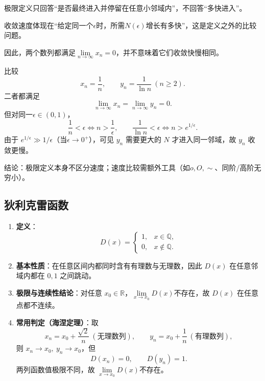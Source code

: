 \documentclass[../book.tex]{subfiles}
\begin{document}
\begin{enumerate}
\begin{itemize}
            \begin{circlenum}
                \item 极限定义只回答“是否最终进入并停留在任意小邻域内”，不回答“多快进入”。
                \item 收敛速度体现在“给定同一个$\epsilon$时，所需$N(\epsilon)$增长有多快”，这是定义之外的比较问题。
                \item 因此，两个数列都满足$\lim\limits_{n\to\infty}x_n=0$，并不意味着它们收敛快慢相同。
            \end{circlenum}
            \begin{analysisbox}[示例]
                比较
                \[
                    x_n=\frac1n,\qquad y_n=\frac1{\ln n}\ (n\ge2).
                \]
                二者都满足
                \[
                    \lim_{n\to\infty}x_n=\lim_{n\to\infty}y_n=0.
                \]
                但对同一$\epsilon\in(0,1)$，
                \[
                    \frac1n<\epsilon \iff n>\frac1\epsilon,
                    \qquad
                    \frac1{\ln n}<\epsilon \iff n>e^{1/\epsilon}.
                \]
                由于 $e^{1/\epsilon}\gg 1/\epsilon$（当$\epsilon\to0^+$），可见 $y_n$ 需要更大的 $N$ 才进入同一邻域，故 $y_n$ 收敛更慢。

                结论：极限定义本身不区分速度；速度比较需额外工具（如$o,O,\sim$、同阶/高阶无穷小）。
            \end{analysisbox}

        \end{itemize}
    \end{enumerate}

    \subsection{狄利克雷函数}

    \begin{enumerate}
        \item \textbf{定义}：
        \[
            D(x)=
            \begin{cases}
                1, & x\in\mathbb{Q},\\
                0, & x\notin\mathbb{Q}.
            \end{cases}
        \]
        \item \textbf{基本性质}：在任意区间内都同时含有有理数与无理数，因此 $D(x)$ 在任意邻域内都在 $0,1$ 之间跳动。
        \item \textbf{极限与连续性结论}：对任意 $x_0\in\mathbb{R}$，$\lim\limits_{x\to x_0}D(x)$不存在，故 $D(x)$ 在任意点都不连续。
        \item \textbf{常用判定（海涅定理）}：取
        \[
            x_n=x_0+\frac{\sqrt{2}}{n}\ (\text{无理数列}),\qquad
            y_n=x_0+\frac{1}{n}\ (\text{有理数列}),
        \]
        则 $x_n\to x_0,\ y_n\to x_0$，但
        \[
            D(x_n)=0,\qquad D(y_n)=1.
        \]
        两列函数值极限不同，故 $\lim\limits_{x\to x_0}D(x)$不存在。
    \end{enumerate}
\end{document}

